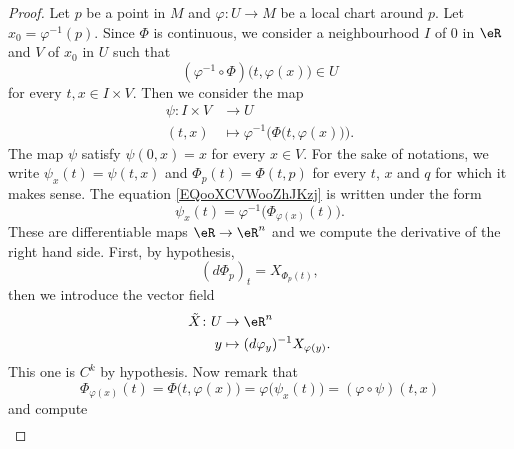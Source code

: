 \begin{proof}
	Let \( p\) be a point in \( M\) and \(\varphi \colon U\to M  \) be a local chart around \( p\). Let \( x_0=\varphi^{-1}(p)\). Since \( \Phi\) is continuous, we consider a neighbourhood \( I\) of \( 0\) in \( \eR\) and \( V\) of \( x_0\) in \( U\) such that
	\begin{equation}
		(\varphi^{-1}\circ\Phi)\big( t,\varphi(x) \big)\in U
	\end{equation}
	for every \( t,x\in I\times V\). Then we consider the map
	\begin{equation}		\label{EQooXCVWooZhJKzj}
		\begin{aligned}
			\psi\colon I\times V & \to U                                                         \\
			(t,x)                & \mapsto \varphi^{-1}\Big( \Phi\big( t,\varphi(x) \big) \Big).
		\end{aligned}
	\end{equation}
	The map \( \psi\) satisfy \( \psi(0,x)=x\) for every \( x\in V\). For the sake of notations, we write \( \psi_x(t)=\psi(t,x)\) and \( \Phi_p(t)=\Phi(t,p)\) for every \( t\), \( x\) and \( q\) for which it makes sense. The equation \eqref{EQooXCVWooZhJKzj} is written under the form
	\begin{equation}
		\psi_x(t)=\varphi^{-1}\Big( \Phi_{\varphi(x)}(t) \Big).
	\end{equation}
	These are differentiable maps \( \eR\to \eR^n\) and we compute the derivative of the right hand side. First, by hypothesis,
	\begin{equation}
		(d\Phi_p)_{t}=X_{\Phi_p(t)},
	\end{equation}
	then we introduce the vector field
	\begin{equation}
		\begin{aligned}
			\tilde X\colon U & \to \eR^n                                \\
			y                & \mapsto (d\varphi_y)^{-1}X_{\varphi(y)}.
		\end{aligned}
	\end{equation}
	This one is \( C^k\) by hypothesis. Now remark that
	\begin{equation}		\label{EQooGBMCooWpYPzq}
		\Phi_{\varphi(x)}(t)=\Phi\big( t,\varphi(x) \big)=\varphi\Big( \psi_{x}(t) \Big)=(\varphi\circ\psi)(t,x)
	\end{equation}
	and compute
	\begin{subequations}
		\begin{align}

\end{align}
\end{subequations}
\end{proof}
